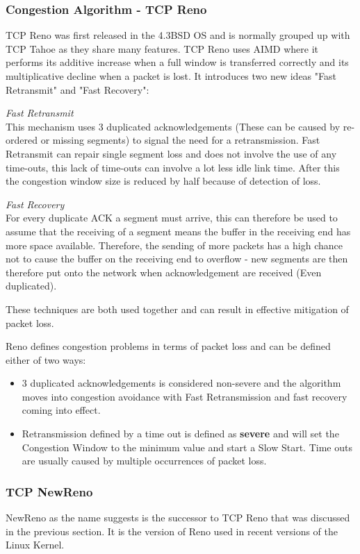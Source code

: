 \subsubsection*{Congestion Algorithm - TCP Reno}
TCP Reno was first released in the 4.3BSD OS and is normally grouped up with TCP Tahoe as they share many features. TCP Reno uses AIMD  where it performs its additive increase when a full window is transferred correctly and its multiplicative decline when a packet is lost. It introduces two new ideas "Fast Retransmit" and "Fast Recovery":

{\it Fast Retransmit}\\
This mechanism uses 3 duplicated acknowledgements (These can be caused by re-ordered or missing segments) to signal the need for a retransmission. Fast Retransmit can repair single segment loss and does not involve the use of any time-outs, this lack of time-outs can involve a lot less idle link time. After this the congestion window size is reduced by half because of detection of loss.

{\it Fast Recovery}\\
For every duplicate ACK a segment must arrive, this can therefore be used to assume that the receiving of a segment means the buffer in the receiving end has more space available. Therefore, the sending of more packets has a high chance not to cause the buffer on the receiving end to overflow - new segments are then therefore put onto the network when acknowledgement are received (Even duplicated). 

These techniques are both used together and can result in effective mitigation of packet loss.

Reno defines congestion problems in terms of packet loss and can be defined either of two ways:

\begin{itemize}
	\item 3 duplicated acknowledgements is considered non-severe and the algorithm moves into congestion avoidance with Fast Retransmission and fast recovery coming into effect.
	\item Retransmission defined by a time out is defined as {\bf severe} and will set the Congestion Window to the minimum value and start a Slow Start. Time outs are usually caused by multiple occurrences of packet loss.
\end{itemize}

\subsubsection*{TCP NewReno}
NewReno \citep{newReno} as the name suggests is the successor to TCP Reno that was discussed in the previous section. It is the version of Reno used in recent versions of the Linux Kernel.

